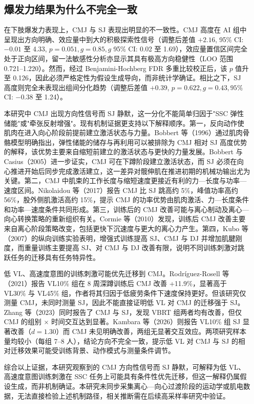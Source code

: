 \documentclass[UTF8,zihao=-4,twoside,openany]{ctexbook}
\begin{document}
\subsection{爆发力结果为什么不完全一致}
在下肢爆发力表现上，CMJ 与 SJ 表现出明显的不一致性。CMJ 高度在 AI 组中呈现出方向明确、效应量中到大的积极探索性信号（调整后差值 $+2.16$, 95\% CI: $-0.01$ 至 4.33, $p=0.051, g=0.85, g$ 95\% CI: 0.02 至 1.69），效应量置信区间完全处于正向区间，留一法敏感性分析亦显示其具有极高方向稳健性（LOO 范围 0.721--1.220）。然而，经过 Benjamini-Hochberg FDR 多重比较校正后，该 $p$ 值升至 0.126，因此必须严格定性为假设生成导向，而非统计学确证。相比之下，SJ 高度则完全未表现出组间分化趋势（调整后差值 $+0.39$, $p=0.622, g=0.43, 95\%$ CI: $-0.38$ 至 1.24）。

本研究中 CMJ 出现方向性信号而 SJ 静默，这一分化不能简单归因于"SSC 弹性储能"或"牵张反射增强"。现有机制证据更支持以下解释顺序。第一，反向动作使肌肉在进入向心阶段前提前建立激活状态与力量。Bobbert 等（1996）通过肌肉骨骼模型明确指出，弹性储能的储存与再利用可以被排除为 CMJ 相对 SJ 高度优势的解释，该优势主要来自缩短前建立的激活状态与更快的力量发展。Bobbert 与 Casius（2005）进一步证实，CMJ 可在下蹲阶段建立激活状态，而 SJ 必须在向心推进开始后同步完成激活建立，这一差异对髋伸肌在推进初期的机械功输出尤为关键。第二，CMJ 中肌束的工作长度与缩短速度更接近有利的力—长度与功率—速度区间。Nikolaidou 等（2017）报告 CMJ 比 SJ 跳高约 5\%，峰值功率高约 56\%，股外侧肌激活高约 15\%，提示 CMJ 的功率优势由肌肉激活、力—长度条件和功率—速度条件共同形成。第三，训练后的 CMJ 改善可能与离心制动及离心—向心转换策略的重新组织有关。Cormie 等（2010）发现，训练后 CMJ 改善主要来自离心阶段策略改变，包括更快下沉速度与更大的离心力产生。第四，Kubo 等（2007）的纵向训练实验表明，增强式训练提高 SJ、CMJ 与 DJ 并增加肌腱刚度，而重量训练主要提高 SJ、对 CMJ 与 DJ 改善有限，说明不同训练刺激对跳跃任务的迁移具有任务特异性。

低 VL、高速度意图的训练刺激可能优先迁移到 CMJ。Rodríguez-Rosell 等（2021）报告 VL10\% 组在 8 周深蹲训练后 CMJ 改善 +11.9\%，显著高于 VL30\% 与 VL45\% 组，作者将其归因于低疲劳条件下速度保持更好。但该研究仅测量 CMJ，未同时测量 SJ，因此不能直接证明低 VL 对 CMJ 的迁移强于 SJ。Zhang 等（2023）同时报告了 CMJ 与 SJ，发现 VBRT 组两者均有改善，但仅 CMJ 的组别 $\times$ 时间交互达到显著。Kambara 等（2026）则报告 VL10\% 组 SJ 显著改善（$d=1.30$）而 CMJ 未见明确改善，两组无显著交互效应。两项研究样本量均较小（每组 7--8 人），结论方向不完全一致，提示低 VL 对 CMJ 与 SJ 的相对迁移效果可能受训练背景、动作模式与测量条件调节。

综合以上证据，本研究观察到的 CMJ 方向性信号而 SJ 静默，可解释为低 VL、高速度意图训练刺激在 SSC 任务上可能具有条件性优先迁移，但这一解释仍属假设生成，而非机制确证。本研究未同步采集离心—向心过渡阶段的运动学或肌电数据，无法直接检验上述机制路径，相关推断需在后续高采样率研究中验证。
\end{document}
